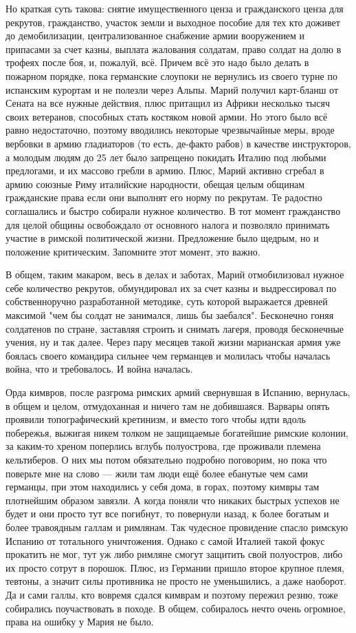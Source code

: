 Но краткая суть такова: снятие имущественного ценза и гражданского ценза для рекрутов, гражданство, участок земли и выходное пособие для тех кто доживет до демобилизации, централизованное снабжение армии вооружением и припасами за счет казны, выплата жалования солдатам, право солдат на долю в трофеях после боя, и, пожалуй, всё. Причем всё это надо было делать в пожарном порядке, пока германские слоупоки не вернулись из своего турне по испанским курортам и не полезли через Альпы. Марий получил карт-бланш от Сената на все нужные действия, плюс притащил из Африки несколько тысяч своих ветеранов, способных стать костяком новой армии. Но этого было всё равно недостаточно, поэтому вводились некоторые чрезвычайные меры, вроде вербовки в армию гладиаторов (то есть, де-факто рабов) в качестве инструкторов, а молодым людям до 25 лет было запрещено покидать Италию под любыми предлогами, и их массово гребли в армию. Плюс, Марий активно сгребал в армию союзные Риму италийские народности, обещая целым общинам гражданские права если они выполнят его норму по рекрутам. Те радостно соглашались и быстро собирали нужное количество. В тот момент гражданство для целой общины освобождало от основного налога и позволяло принимать участие в римской политической жизни. Предложение было щедрым, но и положение критическим. Запомните этот момент, это важно.


В общем, таким макаром, весь в делах и заботах, Марий отмобилизовал нужное себе количество рекрутов, обмундировал их за счет казны и выдрессировал по собственноручно разработанной методике, суть которой выражается древней максимой "чем бы солдат не занимался, лишь бы заебался". Бесконечно гоняя солдатенов по стране, заставляя строить и снимать лагеря, проводя бесконечные учения, ну и так далее. Через пару месяцев такой жизни марианская армия уже боялась своего командира сильнее чем германцев и молилась чтобы началась война, что и требовалось. И война началась.


Орда кимвров, после разгрома римских армий свернувшая в Испанию, вернулась, в общем и целом, отмудоханная и ничего там не добившаяся. Варвары опять проявили топографический кретинизм, и вместо того чтобы идти вдоль побережья, выжигая никем толком не защищаемые богатейшие римские колонии, за каким-то хреном поперлись вглубь полуострова, где проживали племена кельтиберов. О них мы потом обязательно подробно поговорим, но пока что поверьте мне на слово — жили там люди ещё более ебанутые чем сами германцы, при этом находились у себя дома, в горах, поэтому кимвры там плотнейшим образом завязли. А когда поняли что никаких быстрых успехов не будет и они просто тут все погибнут, то повернули назад, к более богатым и более травоядным галлам и римлянам. Так чудесное провидение спасло римскую Испанию от тотального уничтожения. Однако с самой Италией такой фокус прокатить не мог, тут уж либо римляне смогут защитить свой полуостров, либо их просто сотрут в порошок. Плюс, из Германии пришло второе крупное племя, тевтоны, а значит силы противника не просто не уменьшились, а даже наоборот. Да и сами галлы, кто вовремя сдался кимврам и поэтому пережил резню, тоже собирались поучаствовать в походе. В общем, собиралось нечто очень огромное, права на ошибку у Мария не было.



